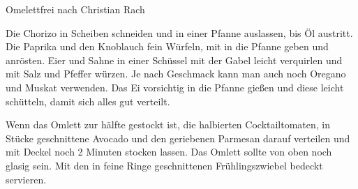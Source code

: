 \begin{recipe}{Omelett}{frei nach Christian Rach}
  \inglist

  \steps

  Die Chorizo in Scheiben schneiden und in einer Pfanne auslassen, bis Öl
  austritt. Die Paprika und den Knoblauch fein Würfeln, mit in die Pfanne
  geben und anrösten. Eier und Sahne in einer Schüssel mit der Gabel leicht
  verquirlen und mit Salz und Pfeffer würzen. Je nach Geschmack kann man auch
  noch Oregano und Muskat verwenden. Das Ei vorsichtig in die Pfanne gießen und
  diese leicht schütteln, damit sich alles gut verteilt.

  Wenn das Omlett zur hälfte gestockt ist, die halbierten Cocktailtomaten, in
  Stücke geschnittene Avocado und den geriebenen Parmesan darauf verteilen und
  mit Deckel noch 2 Minuten stocken lassen. Das Omlett sollte von oben noch
  glasig sein. Mit den in feine Ringe geschnittenen Frühlingszwiebel bedeckt
  servieren.

\end{recipe}
